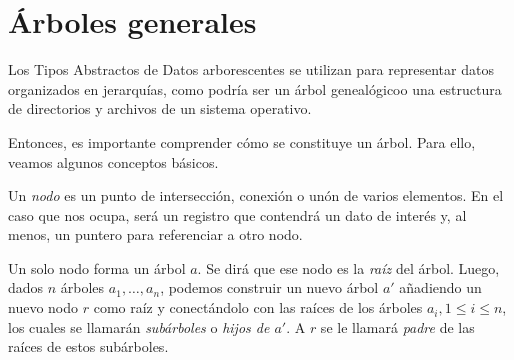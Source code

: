 \section{Árboles generales}
Los Tipos Abstractos de Datos arborescentes se utilizan para representar datos organizados en jerarquías, como podría ser un árbol genealógicoo una estructura de directorios y archivos de un sistema operativo.\newline

Entonces, es importante comprender cómo se constituye un árbol. Para ello, veamos algunos conceptos básicos.

\begin{defi}[Nodo]\label{def nodo}
	Un \textit{nodo} es un punto de intersección, conexión o unón de varios elementos. En el caso que nos ocupa, será un registro que contendrá un dato de interés y, al menos, un puntero para referenciar a otro nodo.
\end{defi}

\begin{obs}
	Un solo nodo forma un árbol $a$. Se dirá que ese nodo es la \textit{raíz} del árbol. Luego, dados $n$ árboles $a_1, \dots, a_n$, podemos construir un nuevo árbol $a'$ añadiendo un nuevo nodo $r$ como raíz y conectándolo con las raíces de los árboles $a_i, 1 \leq i \leq n$, los cuales se llamarán \textit{subárboles} o \textit{hijos de $a'$}. A $r$ se le llamará \textit{padre} de las raíces de estos subárboles.
\end{obs}



